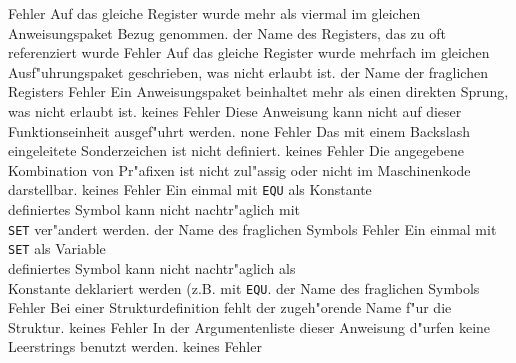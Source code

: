\documentclass[12pt,a4paper,twoside]{report}
\begin{document}
\begin{description}
               {Fehler}
               {Auf das gleiche Register wurde mehr als viermal im
                gleichen Anweisungspaket Bezug genommen.}
               {der Name des Registers, das zu oft referenziert wurde}
               {Fehler}
               {Auf das gleiche Register wurde mehrfach im gleichen
                Ausf"uhrungspaket geschrieben, was nicht erlaubt ist.}
               {der Name der fraglichen Registers}
               {Fehler}
               {Ein Anweisungspaket beinhaltet mehr als einen direkten
                Sprung, was nicht erlaubt ist.}
               {keines}
               {Fehler}
               {Diese Anweisung kann nicht auf dieser Funktionseinheit
                ausgef"uhrt werden.}
               {none}
               {Fehler}
               {Das mit einem Backslash eingeleitete
	        Sonderzeichen ist nicht definiert.}
               {keines}
               {Fehler}
               {Die angegebene Kombination von Pr"afixen
	        ist nicht zul"assig oder nicht im
	        Maschinenkode darstellbar.}
               {keines}
               {Fehler}
               {Ein einmal mit {\tt EQU} als Konstante\\
                definiertes Symbol kann nicht nachtr"aglich mit\\
                {\tt SET} ver"andert werden.}
               {der Name des fraglichen Symbols}
               {Fehler}
               {Ein einmal mit {\tt SET} als Variable\\
                definiertes Symbol kann nicht nachtr"aglich als\\
                Konstante deklariert werden (z.B. mit {\tt EQU}.}
               {der Name des fraglichen Symbols}
               {Fehler}
               {Bei einer Strukturdefinition fehlt der zugeh"orende
                Name f"ur die Struktur.}
               {keines}
               {Fehler}
               {In der Argumentenliste dieser Anweisung d"urfen keine
                Leerstrings benutzt werden.}
               {keines}
               {Fehler}

\end{description}
\end{document}
